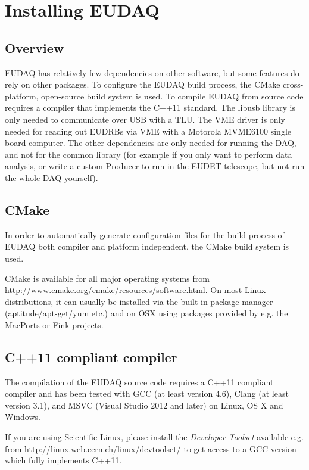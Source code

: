 \section{Installing EUDAQ}

\subsection{Overview}
EUDAQ has relatively few dependencies on other software, but some
features do rely on other packages.
To configure the EUDAQ build process, the CMake cross-platform, open-source build system is used.
To compile EUDAQ from source code requires a compiler that implements
the C++11 standard.
The libusb library is only needed to communicate over USB with a \gls{TLU}\cite{Cussans2009}.
The VME driver is only needed for reading out \glspl{EUDRB}\cite{Cotta2008}
via VME with a Motorola MVME6100 single board computer.
The other dependencies are only needed for running the DAQ, and not for the common library
(for example if you only want to perform data analysis,
or write a custom Producer to run in the EUDET telescope,
but not run the whole DAQ yourself).

\subsection{CMake}
In order to automatically generate configuration files for the build
process of EUDAQ both compiler and platform independent, the CMake
build system is used.

CMake is available for all major operating systems from
\url{http://www.cmake.org/cmake/resources/software.html}. On most
Linux distributions, it can usually be installed via the built-in
package manager (aptitude/apt-get/yum etc.) and on OSX using
packages provided by e.g. the MacPorts or Fink projects.

\subsection{C++11 compliant compiler}
The compilation of the EUDAQ source code requires a C++11 compliant
compiler and has been tested with GCC (at
least version 4.6), Clang (at least version 3.1), and MSVC (Visual
Studio 2012 and later) on Linux, OS X and Windows.

If you are using Scientific Linux, please install the \emph{Developer
  Toolset} available e.g. from
\url{http://linux.web.cern.ch/linux/devtoolset/} to get access to a
GCC version which fully implements C++11.


